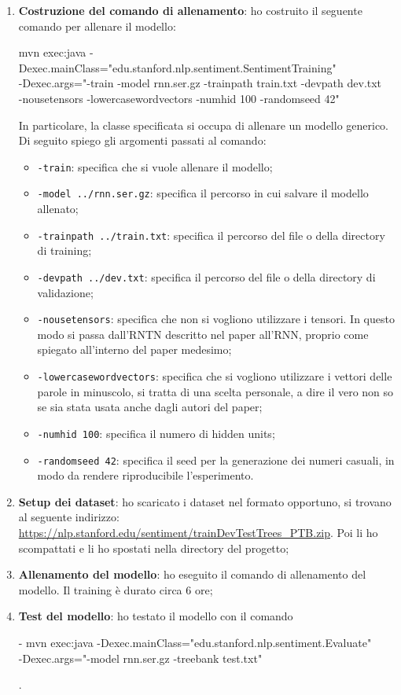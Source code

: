 \begin{enumerate}
	\item \textbf{Costruzione del comando di allenamento}: ho costruito il 
		seguente comando per allenare il modello:\\
		\begin{texttt}
			mvn exec:java -Dexec.mainClass="edu.stanford.nlp.sentiment.SentimentTraining"\\
			-Dexec.args="-train -model rnn.ser.gz -trainpath train.txt -devpath dev.txt \\
			-nousetensors -lowercasewordvectors -numhid 100 -randomseed 42"
		\end{texttt}

		In particolare, la classe specificata si occupa di allenare un modello
		generico. Di seguito spiego gli argomenti passati al comando:
		\begin{itemize}
			\item \texttt{-train}: specifica che si vuole allenare il modello;
			\item \texttt{-model ../rnn.ser.gz}: specifica il percorso in cui
				salvare il modello allenato;
			\item \texttt{-trainpath ../train.txt}: specifica il percorso del
				file o della directory di training;
			\item \texttt{-devpath ../dev.txt}: specifica il percorso del file
				o della directory di validazione;
			\item \texttt{-nousetensors}: specifica che non si vogliono
					utilizzare i tensori. In questo modo si passa dall'RNTN
					descritto nel paper all'RNN, proprio come spiegato
					all'interno del paper medesimo;
			\item \texttt{-lowercasewordvectors}: specifica che si vogliono
				utilizzare i vettori delle parole in minuscolo, si tratta di una
				scelta personale, a dire il vero non so se sia stata usata anche
				dagli autori del paper;
			\item \texttt{-numhid 100}: specifica il numero di hidden units;
			\item \texttt{-randomseed 42}: specifica il seed per la generazione
				dei numeri casuali, in modo da rendere riproducibile 
				l'esperimento.
		\end{itemize}

	\item \textbf{Setup dei dataset}: ho scaricato i dataset nel formato
		opportuno, si trovano al seguente indirizzo:
		\url{https://nlp.stanford.edu/sentiment/trainDevTestTrees_PTB.zip}. Poi
		li ho scompattati e li ho spostati nella directory del progetto;

	\item \textbf{Allenamento del modello}: ho eseguito il comando di
		allenamento del modello. Il training è durato circa 6 ore;

	\item \textbf{Test del modello}: ho testato il modello con il comando\\
		\begin{texttt}
		- mvn exec:java -Dexec.mainClass="edu.stanford.nlp.sentiment.Evaluate" \\
		-Dexec.args="-model rnn.ser.gz -treebank test.txt"
		\end{texttt}.
\end{enumerate}

